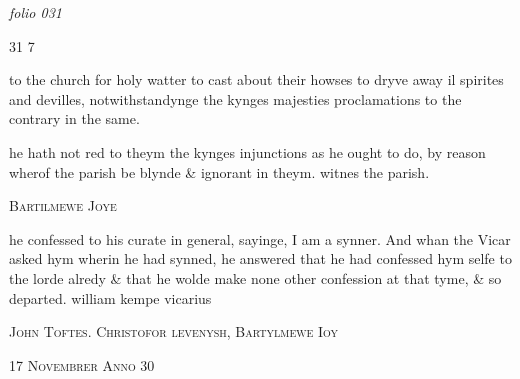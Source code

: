 \documentclass[12pt, a4paper]{book}
\begin{document}
\textit{folio 031}

	
	\begin{flushright}{\color{Mahogany}31} 7\end{flushright}

	
		\ifthenelse{\isodd{\thepage}}
		{\reversemarginpar}
		{\normalmarginpar}
		to the church for holy watter to cast about their howses
 to dryve away il spirites and devilles, notwithstandynge
 the kynges majesties proclamations to the contrary in the same.


				\marginpar[\vspace{0.5cm}{\textcolor{Gray}{Injunctions}}]{}
			
		\ifthenelse{\isodd{\thepage}}
		{\reversemarginpar}
		{\normalmarginpar}
		he hath not red to theym the kynges injunctions as he
 ought to do, by reason wherof the parish be blynde
 \& ignorant in theym. witnes the parish.
 

            
            	
				\begin{center} \begin{large} {\scshape Bartilmewe Joye} \end{large} \end{center}
			


				\marginpar[\vspace{0.5cm}{\textcolor{Gray}{confession}}]{}
			
		\ifthenelse{\isodd{\thepage}}
		{\reversemarginpar}
		{\normalmarginpar}
		he confessed to his curate in general, sayinge, I am a synner.
 And whan the Vicar asked hym wherin he had synned,
 he answered that he had confessed hym selfe to the lorde alredy
 \&  that he
			 wolde make none other confession at that tyme, \& so
	departed. william kempe vicarius
 

            
               
				\begin{center} \begin{large} {\scshape John Toftes. Christofor levenysh,
               	Bartylmewe Ioy } \end{large} \end{center}
			
               
                  
				\begin{center}  {\scshape 
                     17 Novembrer Anno 30
                  }  \end{center}
			
\end{document}
